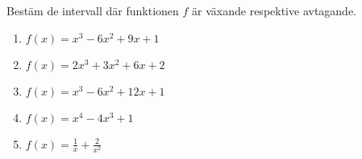 

Bestäm de intervall där funktionen $f$ är växande respektive avtagande.

\begin{enumerate}
\item $ f(x) = x^3-6x^2+9x+1  $
\item $ f(x) =  2x^3+3x^2+6x+2 $
\item $ f(x) =  x^3-6x^2+12x+1 $
\item $ f(x) =  x^4-4x^3+1 $
\item $ f(x) =  \frac{1}{x}+\frac{2}{x^2} $
\end{enumerate}
